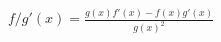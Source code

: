 \documentclass[preview]{standalone}
\begin{document}
\begin{align*}
f/g'(x) = \frac{g(x) f'(x) - f(x) g'(x)} {g(x)^2}
\end{align*}
\end{document}
